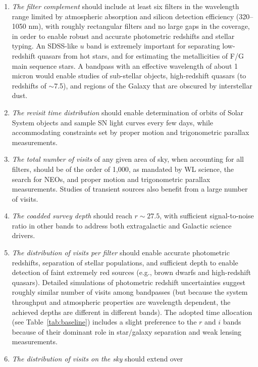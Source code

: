 \begin{enumerate}
\item  \textit{The filter complement} should include at least six filters
    in the wavelength range limited by atmospheric absorption and
    silicon detection efficiency (320--1050 nm), with roughly
    rectangular filters and no large gaps in the coverage, in order
    to enable robust and accurate photometric redshifts and stellar typing. An
    SDSS-like $u$ band \citep{1996AJ....111.1748F} is extremely important for separating
    low-redshift quasars from hot stars, and for estimating the metallicities of
    F/G main sequence stars. A bandpass with an effective wavelength of
    about 1 micron  would enable studies of sub-stellar objects, high-redshift
    quasars (to redshifts of $\sim$7.5), and regions of the Galaxy that are obscured
    by interstellar dust.
\item  \textit{The revisit time distribution} should enable determination of
   orbits of Solar System objects and sample SN light curves every few days,
   while accommodating constraints set by proper motion and trigonometric
   parallax measurements.
\item  \textit{The total number of visits} of any given area of sky, when accounting for all
   filters, should be of the order of 1,000, as mandated by WL
   science, the search for NEOs, and proper motion and
   trigonometric parallax measurements. Studies of transient sources
   also benefit from a large number of visits.
\item  \textit{The coadded survey depth} should reach
    $r\sim27.5$, with sufficient signal-to-noise ratio in other bands
    to address both extragalactic and Galactic science drivers.
\item  \textit{The distribution of visits per filter} should enable
   accurate photometric redshifts, separation of stellar populations,
   and sufficient depth to enable detection of faint extremely red
   sources (e.g., brown dwarfs and high-redshift quasars). Detailed simulations of
   photometric redshift uncertainties
   suggest roughly similar number of visits among bandpasses
   (but because the system throughput and atmospheric properties are
    wavelength dependent, the achieved depths are different in different
    bands). The adopted time allocation
   (see Table~\ref{tab:baseline}) includes a slight preference to the $r$ and $i$ bands because of their
   dominant role in star/galaxy separation and weak lensing measurements.
\item  \textit{The distribution of visits on the sky} should extend over

\end{enumerate}
